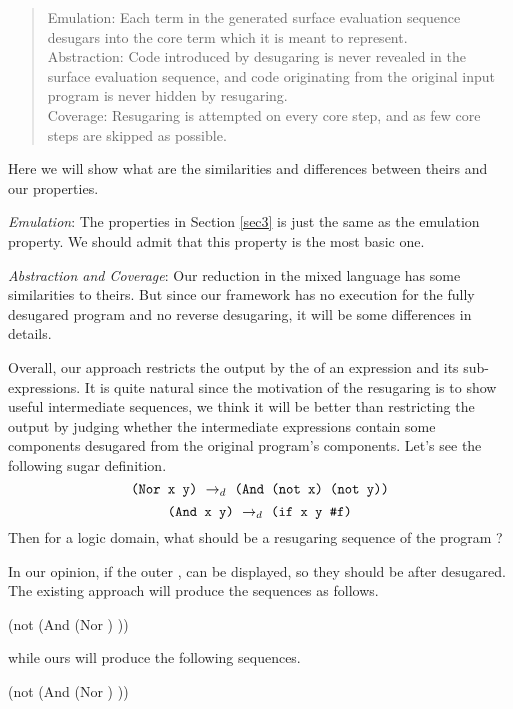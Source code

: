 \begin{quote}
Emulation: 
Each term in the generated surface evaluation sequence desugars into the core term which it is meant to represent.\\
Abstraction: 
Code introduced by desugaring is never revealed in the surface evaluation sequence, and code originating from the original input program is never hidden by resugaring.\\
Coverage: Resugaring is attempted on every core step, and as few core steps are skipped as possible.\\
\end{quote}
Here we will show what are the similarities and differences between theirs and our properties.

\emph{Emulation}: The properties in Section \ref{sec3} is just the same as the emulation property. We should admit that this property is the most basic one.

\emph{Abstraction and Coverage}: Our reduction in the mixed language has some similarities to theirs. But since our framework has no execution for the fully desugared program and no reverse desugaring, it will be some differences in details.

Overall, our approach restricts the output by the  of an expression and its sub-expressions. It is quite natural since the motivation of the resugaring is to show useful intermediate sequences, we think it will be better than restricting the output by judging whether the intermediate expressions contain some components desugared from the original program's components. Let's see the following sugar definition.
\[
\texttt{(Nor~x~y)} ~\rightarrow_d~ \texttt{(And~(not~x)~(not~y))}
\]
\[
\texttt{(And~x~y)} ~\rightarrow_d~ \texttt{(if~x~y~\#f)}
\]
Then for a logic domain, what should be a resugaring sequence of the program  ?

In our opinion, if the outer ,  can be displayed, so they should be after desugared.
The existing approach will produce the sequences as follows.
\begin{footnotesize}
\begin{Codes}
    (not (And (Nor \false \true) \true))
\OneStep{ \true}
\end{Codes}
\end{footnotesize}
while ours will produce the following sequences.
\begin{footnotesize}
\begin{Codes}
    (not (And (Nor \false \true) \true))
\OneStep{ \true}
\end{Codes}
\end{footnotesize}

